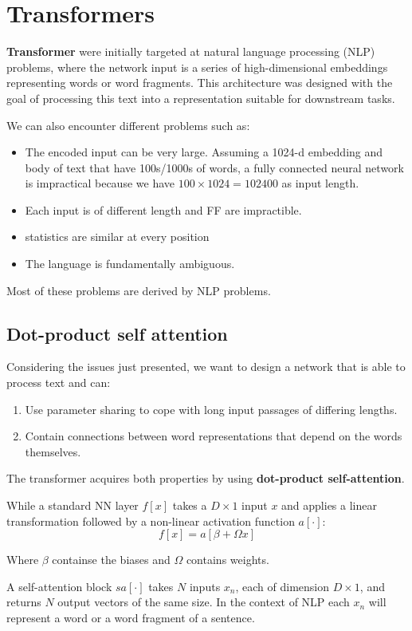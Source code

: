 \chapter{Transformers}
\textbf{Transformer} were initially targeted at natural language processing (NLP) problems, where the 
network input is a series of high-dimensional embeddings representing words or word fragments. This
architecture was designed with the goal of processing this text into a representation suitable for
downstream tasks. 

We can also encounter different problems such as:
\begin{itemize}
    \item The encoded input can be very large. Assuming a 1024-d embedding and body of text that have 100s/1000s of
        words, a fully connected neural network is impractical because we have $100 \times 1024 = 102400$ as input
        length. 
    \item Each input is of different length and FF are impractible.
    \item statistics are similar at every position 
    \item The language is fundamentally ambiguous.
\end{itemize}

Most of these problems are derived by NLP problems. 
\section{Dot-product self attention}
Considering the issues just presented, we want to design a network that is able to process text and can:
\begin{enumerate}
    \item Use parameter sharing to cope with long input passages of differing lengths.
    \item Contain connections between word representations that depend on the words themselves.
\end{enumerate}
The transformer acquires both properties by using \textbf{dot-product self-attention}. 

While a standard NN layer $f[x]$ takes a $D\times 1$ input $x$ and applies a linear transformation followed by
a non-linear activation function $a[\cdot]$:
$$f[x] = a[\beta + \Omega x]$$

Where $\beta$ containse the biases and $\Omega$ contains weights.

A self-attention block $sa[\cdot]$
takes $N$ inputs $x_n$, each of dimension $D \times 1$, and returns $N$ output vectors of the same size. 
In the context of NLP each $x_n$ will represent a word or a word fragment of a sentence.

